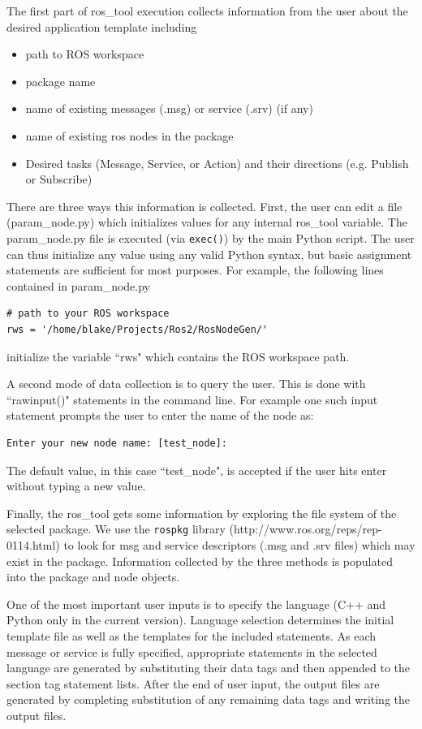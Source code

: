 \documentclass[letterpaper, 10 pt, conference]{ieeeconf}  %
\begin{document}
The first part of ros\_tool execution collects information from the user about the desired application template including
\begin{itemize}
  \item path to ROS workspace
  \item package name
  \item name of existing messages (.msg) or service (.srv) (if any)
  \item name of existing ros nodes in the package
  \item Desired tasks (Message, Service, or Action) and their directions (e.g. Publish or Subscribe)
\end{itemize}

There are three ways this information is collected.   First, the user can edit a file (param\_node.py) which initializes values for any internal ros\_tool variable.  The  param\_node.py file is executed (via {\tt exec()}) by the main Python script.  The user can thus initialize any value using any valid Python syntax, but basic assignment statements are sufficient for most purposes.  For example, the following lines contained in param\_node.py

\begin{verbatim}
# path to your ROS workspace
rws = '/home/blake/Projects/Ros2/RosNodeGen/'
\end{verbatim}

initialize the variable ``rws" which contains the ROS workspace path. 

A second mode of data collection is to query the user.   This is done with ``rawinput()" statements in the command line.  For example one such input statement prompts the user to enter the name of the node as:

\begin{verbatim}
Enter your new node name: [test_node]: 
\end{verbatim}

The default value, in this case ``test\_node", is accepted if the user hits enter without typing a new value.

Finally, the ros\_tool gets some information by exploring the file system of the selected package.  We use the {\tt rospkg} library (http://www.ros.org/reps/rep-0114.html) to look for msg and service descriptors (.msg and .srv files) which may exist in the package.   Information collected by the three methods is populated into the package and node objects.  

One of the most important user inputs is to specify the language (C++ and Python only in the current version).   Language selection determines the initial template file as well as the templates for the included statements.  As each message or service is fully specified, appropriate statements in the selected language are generated by substituting their data tags and then appended to the section tag statement lists.    After the end of user input, the output files are generated by completing substitution of any remaining data tags and writing the output files. 
\end{document}
